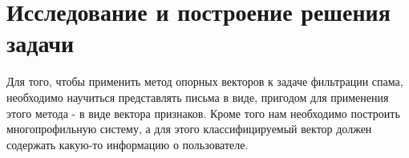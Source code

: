 \newpage
\section{Исследование и построение решения задачи}
\label{research}

Для того, чтобы применить метод опорных векторов к задаче фильтрации спама,
необходимо научиться представлять письма в виде, пригодом для применения
этого метода - в виде вектора признаков.
Кроме того нам необходимо построить многопрофильную систему, а для этого
классифицируемый вектор должен содержать какую-то информацию о пользователе.

